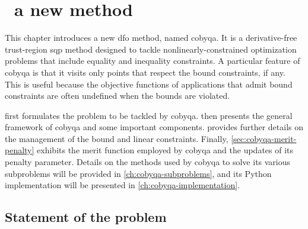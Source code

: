 %
%
%
\chapter{ \textemdash\ a new  method}
\label{ch:cobyqa-introduction}

This chapter introduces a new \gls{dfo} method, named \gls{cobyqa}.
It is a derivative-free trust-region \gls{sqp} method designed to tackle nonlinearly-constrained optimization problems that include equality and inequality constraints.
A particular feature of \gls{cobyqa} is that it visits only points that respect the bound constraints, if any.
This is useful because the objective functions of applications that admit bound constraints are often undefined when the bounds are violated.

 first formulates the problem to be tackled by \gls{cobyqa}.
 then presents the general framework of \gls{cobyqa} and some important components.
 provides further details on the management of the bound and linear constraints.
Finally, \cref{sec:cobyqa-merit-penalty} exhibits the merit function employed by \gls{cobyqa} and the updates of its penalty parameter.
Details on the methods used by \gls{cobyqa} to solve its various subproblems will be provided in \cref{ch:cobyqa-subproblems}, and its Python implementation will be presented in \cref{ch:cobyqa-implementation}.

\section{Statement of the problem}
\label{sec:cobyqa-statement}

